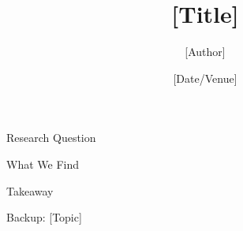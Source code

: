\documentclass[aspectratio=169,12pt]{beamer}
\title{[Title]}
\author{[Author]}
\institute{[Institution]}
\date{[Date/Venue]}
\begin{document}
\begin{frame}[plain]
\titlepage
\end{frame}


\begin{frame}{Research Question}
\end{frame}


\begin{frame}{What We Find}
\end{frame}






\begin{frame}{Takeaway}
\end{frame}

\appendix

\begin{frame}{Backup: [Topic]}
\end{frame}
\end{document}
